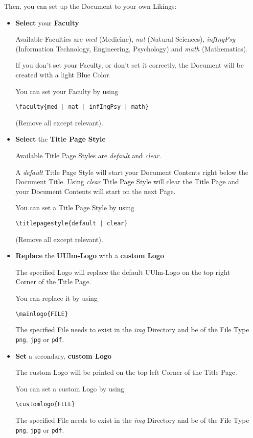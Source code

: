 \documentclass[a4paper]{../uulm-document}
\begin{document}
Then, you can set up the Document to your own Likings:
\begin{itemize}
\item \textbf{Select} your \textbf{Faculty}

Available Faculties are \textit{med} (Medicine), \textit{nat} (Natural Sciences), \textit{infIngPsy} (Information Technology, Engineering, Psychology) and \textit{math} (Mathematics). 

If you don't set your Faculty, or don't set it correctly, the Document will be created with a light Blue Color.

You can set your Faculty by using
\begin{lstlisting}
\faculty{med | nat | infIngPsy | math}
\end{lstlisting}
(Remove all except relevant).

\item \textbf{Select} the \textbf{Title Page Style}

Available Title Page Styles are \textit{default} and \textit{clear}.

A \textit{default} Title Page Style will start your Document Contents right below the Document Title. Using \textit{clear} Title Page Style will clear the Title Page and your Document Contents will start on the next Page.

You can set a Title Page Style by using
\begin{lstlisting}
\titlepagestyle{default | clear}
\end{lstlisting}
(Remove all except relevant).

\item \textbf{Replace} the \textbf{UUlm-Logo} with a \textbf{custom Logo}

The specified Logo will replace the default UUlm-Logo on the top right Corner of the Title Page.

You can replace it by using
\begin{lstlisting}
\mainlogo{FILE}
\end{lstlisting}
The specified File needs to exist in the \textit{img} Directory and be of the File Type \texttt{png}, \texttt{jpg} or \texttt{pdf}.

\item \textbf{Set} a secondary, \textbf{custom Logo}

The custom Logo will be printed on the top left Corner of the Title Page.

You can set a custom Logo by using
\begin{lstlisting}
\customlogo{FILE}
\end{lstlisting}
The specified File needs to exist in the \textit{img} Directory and be of the File Type \texttt{png}, \texttt{jpg} or \texttt{pdf}.


\end{itemize}
\end{document}
